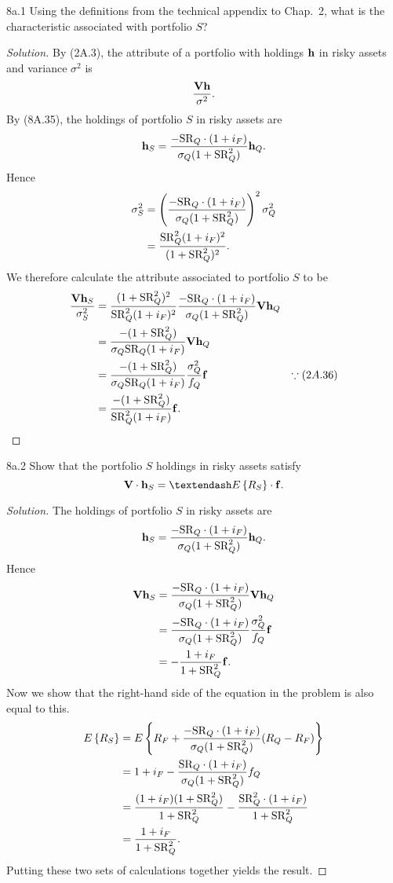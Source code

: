 
\begin{problem}{8a.1}
Using the definitions from the technical appendix to Chap.\ 2, what is the characteristic associated
with portfolio $S$?
\end{problem}
\begin{proof}[Solution]
By (2A.3), the attribute of a portfolio with holdings $\mathbf{h}$ in risky assets and variance $\sigma^{2}$ is \[\frac{\mathbf{V}\mathbf{h}}{\sigma^{2}}.\] By (8A.35), the holdings of portfolio $S$ in risky assets are \[\mathbf{h}_{S} = \frac{-\mathrm{SR}_{Q} \cdot (1 + i_{F})}{\sigma_{Q}(1 + \mathrm{SR}^{2}_{Q})}\mathbf{h}_{Q}.\] Hence
\begin{align*}
\sigma_{S}^{2} &= \left(\frac{-\mathrm{SR}_{Q} \cdot (1 + i_{F})}{\sigma_{Q}(1 + \mathrm{SR}^{2}_{Q})}\right)^{2}\sigma_{Q}^{2} \\
&= \frac{\mathrm{SR}_{Q}^{2}(1 + i_{F})^{2}}{(1 + \mathrm{SR}_{Q}^{2})^{2}}.
\end{align*}
We therefore calculate the attribute associated to portfolio $S$ to be
\begin{align*}
\frac{\mathbf{V}\mathbf{h}_{S}}{\sigma_{S}^{2}} &= \frac{(1 + \mathrm{SR}_{Q}^{2})^{2}}{\mathrm{SR}_{Q}^{2}(1 + i_{F})^{2}}\frac{-\mathrm{SR}_{Q} \cdot (1 + i_{F})}{\sigma_{Q}(1 + \mathrm{SR}^{2}_{Q})}\mathbf{V}\mathbf{h}_{Q}\\
&= \frac{-(1 + \mathrm{SR}_{Q}^{2})}{\sigma_{Q}\mathrm{SR}_{Q}(1 + i_{F})}\mathbf{V}\mathbf{h}_{Q}\\
&= \frac{-(1 + \mathrm{SR}_{Q}^{2})}{\sigma_{Q}\mathrm{SR}_{Q}(1 + i_{F})} \frac{\sigma_{Q}^{2}}{f_{Q}}\mathbf{f} & \because (2A.36)\\
&= \frac{-(1 + \mathrm{SR}_{Q}^{2})}{\mathrm{SR}^{2}_{Q}(1 + i_{F})}\mathbf{f}.
\end{align*}
\end{proof}


\begin{problem}{8a.2}
Show that the portfolio $S$ holdings in risky assets satisfy
\[\V \cdot \h_{S} = –\EX{R_{S}} \cdot \f.\]
\end{problem}
\begin{proof}[Solution]
The holdings of portfolio $S$ in risky assets are \[\mathbf{h}_{S} = \frac{-\mathrm{SR}_{Q} \cdot (1 + i_{F})}{\sigma_{Q}(1 + \mathrm{SR}^{2}_{Q})}\mathbf{h}_{Q}.\] Hence
\begin{align*}
\mathbf{V}\mathbf{h}_{S} &= \frac{-\mathrm{SR}_{Q} \cdot (1 + i_{F})}{\sigma_{Q}(1 + \mathrm{SR}^{2}_{Q})}\mathbf{V}\mathbf{h}_{Q}\\
&= \frac{-\mathrm{SR}_{Q} \cdot (1 + i_{F})}{\sigma_{Q}(1 + \mathrm{SR}^{2}_{Q})}\frac{\sigma_{Q}^{2}}{f_{Q}}\mathbf{f}\\
&= -\frac{1 + i_{F}}{1 + \mathrm{SR}_{Q}^{2}}\mathbf{f}.
\end{align*}
Now we show that the right-hand side of the equation in the problem is also equal to this.
\begin{align*}
E\left\{R_{S}\right\} &= E\left\{R_{F} + \frac{-\mathrm{SR}_{Q} \cdot (1 + i_{F})}{\sigma_{Q}(1 + \mathrm{SR}^{2}_{Q})}(R_{Q} - R_{F})\right\}\\
&= 1 + i_{F} - \frac{\mathrm{SR}_{Q} \cdot (1 + i_{F})}{\sigma_{Q}(1 + \mathrm{SR}^{2}_{Q})}f_{Q}\\
&= \frac{(1 + i_{F})(1 + \mathrm{SR}_{Q}^{2})}{1 + \mathrm{SR}_{Q}^{2}} - \frac{\mathrm{SR}^{2}_{Q} \cdot (1 + i_{F})}{1 + \mathrm{SR}^{2}_{Q}}\\
&= \frac{1 + i_{F}}{1 + \mathrm{SR}_{Q}^{2}}.
\end{align*}
Putting these two sets of calculations together yields the result.
\end{proof}


